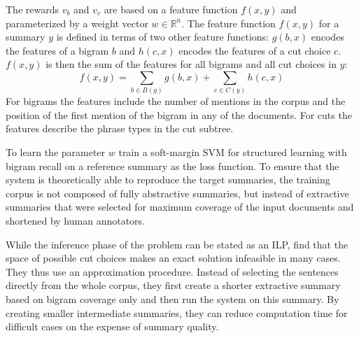 \documentclass[a4paper,BCOR=10mm]{report}
\numberwithin{lemma}{chapter}
\numberwithin{definition}{chapter}
\begin{document}
The rewards $v_b$ and $v_c$ are based on a feature function $f(x, y)$ and parameterized by a weight vector $w \in \mathbb{R}^n$.
The feature function $f(x, y)$ for a summary $y$ is defined in terms of two other feature functions: $g(b, x)$ encodes the features of a bigram $b$ and $h(c, x)$ encodes the features of a cut choice $c$. $f(x, y)$ is then the sum of the features for all bigrams and all cut choices in $y$:
\begin{equation}
f(x, y) = \sum_{b \in B(y)} g(b, x) + \sum_{c \in C(y)} h(c, x)
\end{equation}
For bigrams the features include the number of mentions in the corpus and the position of the first mention of the bigram in any of the documents.
For cuts the features describe the phrase types in the cut subtree.

To learn the parameter $w$ \citeauthor{berg-kirkpatrick} train a soft-margin SVM for structured learning \citet{svm} with bigram recall on a reference summary as the loss function. To ensure that the system is theoretically able to reproduce the target summaries, the training corpus is not composed of fully abstractive summaries, but instead of extractive summaries that were selected for maximum coverage of the input documents and shortened by human annotators.

While the inference phase of the problem can be stated as an ILP, \citet{berg-kirkpatrick} find that the space of possible cut choices makes an exact solution infeasible in many cases. They thus use an approximation procedure. Instead of selecting the sentences directly from the whole corpus, they first create a shorter extractive summary based on bigram coverage only and then run the system on this summary. By creating smaller intermediate summaries, they can reduce computation time for difficult cases on the expense of summary quality.




\end{document}
